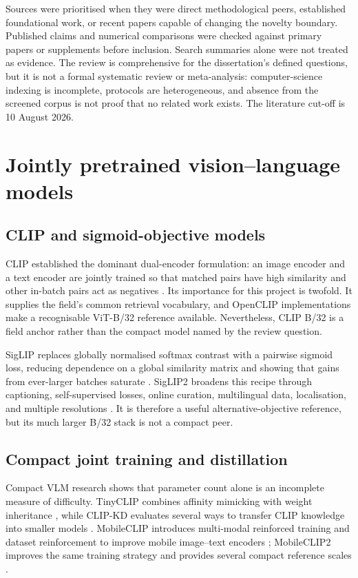 \documentclass[11pt,a4paper,oneside]{report}
\begin{document}
Sources were prioritised when they were direct methodological peers, established
foundational work, or recent papers capable of changing the novelty boundary.
Published claims and numerical comparisons were checked against primary papers
or supplements before inclusion. Search summaries alone were not treated as
evidence. The review is comprehensive for the dissertation's defined questions,
but it is not a formal systematic review or meta-analysis: computer-science
indexing is incomplete, protocols are heterogeneous, and absence from the
screened corpus is not proof that no related work exists. The literature cut-off
is 10 August 2026.

\section{Jointly pretrained vision--language models}

\subsection{CLIP and sigmoid-objective models}

CLIP established the dominant dual-encoder formulation: an image encoder and a
text encoder are jointly trained so that matched pairs have high similarity and
other in-batch pairs act as negatives \cite{radford2021clip}. Its importance for
this project is twofold. It supplies the field's common retrieval vocabulary,
and OpenCLIP implementations make a recognisable ViT-B/32 reference available.
Nevertheless, CLIP B/32 is a field anchor rather than the compact model named by
the review question.

SigLIP replaces globally normalised softmax contrast with a pairwise sigmoid
loss, reducing dependence on a global similarity matrix and showing that gains
from ever-larger batches saturate \cite{zhai2023siglip}. SigLIP2 broadens this
recipe through captioning, self-supervised losses, online curation, multilingual
data, localisation, and multiple resolutions \cite{tschannen2025siglip2}. It is
therefore a useful alternative-objective reference, but its much larger B/32
stack is not a compact peer.

\subsection{Compact joint training and distillation}

Compact VLM research shows that parameter count alone is an incomplete measure
of difficulty. TinyCLIP combines affinity mimicking with weight inheritance
\cite{wu2023tinyclip}, while CLIP-KD evaluates several ways to transfer CLIP
knowledge into smaller models \cite{yang2024clipkd}. MobileCLIP introduces
multi-modal reinforced training and dataset reinforcement to improve mobile
image--text encoders \cite{vasu2024mobileclip}; MobileCLIP2 improves the same
training strategy and provides several compact reference scales
\cite{faghri2025mobileclip2}.
\end{document}
